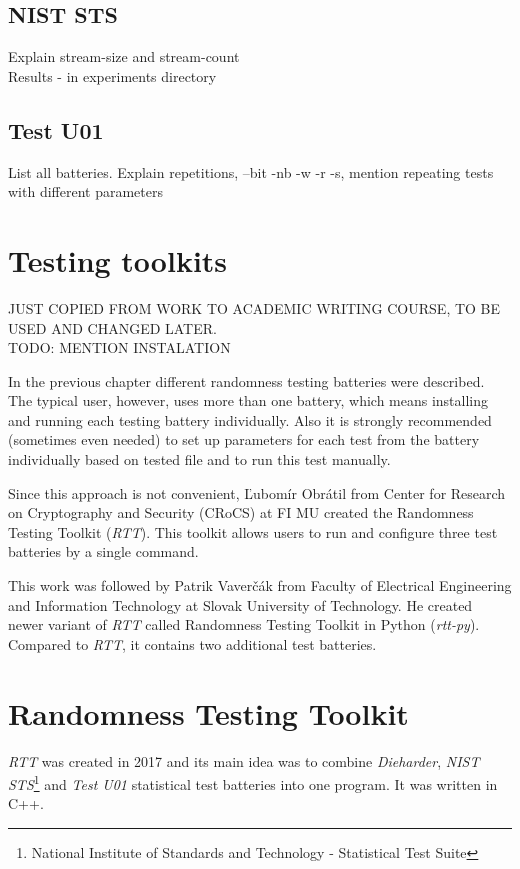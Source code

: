 \documentclass[
  digital,     %
  oneside,     %
  nosansbold,  %
  nocolorbold, %
  nolof,         %
  nolot,         %
]{fithesis4}
\begin{document}
\subsection{NIST STS}
Explain stream-size and stream-count\\
Results - in experiments directory

\subsection{Test U01}
List all batteries.
Explain repetitions, --bit -nb -w -r -s, mention repeating tests with different parameters


\section{Testing toolkits}\label{analysis}
JUST COPIED FROM WORK TO ACADEMIC WRITING COURSE, TO BE USED AND CHANGED LATER.\\

TODO: MENTION INSTALATION



In the previous chapter different randomness testing batteries were described. The typical user, however, uses more than one battery, which means installing and running each testing battery individually. Also it is strongly recommended (sometimes even needed) to set up parameters for each test from the battery individually based on tested file and to run this test manually.

Since this approach is not convenient, Ľubomír Obrátil from Center for Research on Cryptography and Security (CRoCS) at FI MU created the Randomness Testing Toolkit (\emph{RTT}). This toolkit allows users to run and configure three test batteries by a single command.

This work was followed by Patrik Vaverčák from Faculty of Electrical Engineering and Information Technology at Slovak University of Technology. He created newer variant of \emph{RTT} called Randomness Testing Toolkit in Python (\emph{rtt-py}). Compared to \emph{RTT}, it contains two additional test batteries. 

\section{Randomness Testing Toolkit}

\emph{RTT} was created in 2017 and its main idea was to combine \emph{Dieharder}, \emph{NIST STS}\footnote{National Institute of Standards and Technology - Statistical Test Suite} and \emph{Test U01} statistical test batteries into one program. It was written in C++. 
\end{document}
